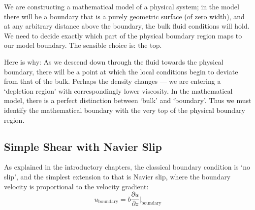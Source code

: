 \documentclass[a4paper]{report}
\begin{document}
We are constructing a mathematical model of a physical system; in the model there will be a boundary that is a purely geometric surface (of zero width), and at any arbitrary distance above the boundary, the bulk fluid conditions will hold.  We need to decide exactly which part of the physical boundary region maps to our model boundary.  The sensible choice is: the top.

Here is why: As we descend down through the fluid towards the physical boundary, there will be a point at which the local conditions begin to deviate from that of the bulk.  Perhaps the density changes --- we are entering a `depletion region' with correspondingly lower viscosity.  In the mathematical model, there is a perfect distinction between `bulk' and `boundary'.  Thus we must identify the mathematical boundary with the very top of the physical boundary region.


\begin{center}
\end{center}


\subsection*{Simple Shear with Navier Slip}

As explained in the introductory chapters, the classical boundary condition is `no slip', and the simplest extension to that is Navier slip, where the boundary velocity is proportional to the velocity gradient:
\begin{equation}
u_{\text{boundary}} = b \frac{\partial u}{\partial z} \bigg|_{\text{boundary}}
\end{equation}
\end{document}
